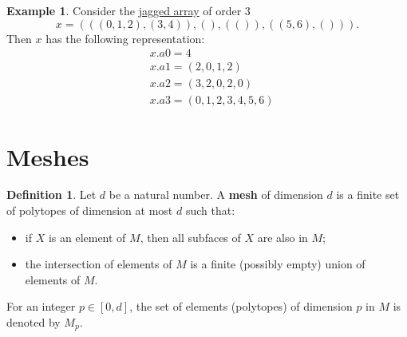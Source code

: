 \documentclass[fleqn]{article}
\theoremstyle{definition}
\newtheorem{definition}[theorem]{Definition}
\newtheorem{example}[theorem]{Example}
\begin{document}
\begin{example}
  Consider the \hyperref[idec:jagged:definition]{jagged array} of order $3$
  \begin{equation}
    x = (((0, 1, 2), (3, 4)), (), (()), ((5, 6), ())).
  \end{equation}
  Then $x$ has the following representation:
  \begin{equation}
    \begin{split}
      & x.a0 = 4 \\
      & x.a1 = (2, 0, 1, 2) \\
      & x.a2 = (3, 2, 0, 2, 0) \\
      & x.a3 = (0, 1, 2, 3, 4 , 5, 6)
    \end{split}
  \end{equation}
\end{example}

\section{Meshes}

\begin{definition}
  \label{idec:mesh:definition}
  Let $d$ be a natural number.
  A \textbf{mesh}
  of dimension $d$ is a finite set of polytopes of dimension at
  most $d$ such that:
  \begin{itemize}
    \item
      if $X$ is an element of $M$, then all subfaces of $X$ are also in $M$;
    \item
      the intersection of elements of $M$ is a finite (possibly empty) union of
      elements of $M$.
  \end{itemize}
  For an integer $p \in [0, d]$, the set of elements (polytopes) of dimension
  $p$ in $M$ is denoted by $M_p$.
\end{definition}
\end{document}
